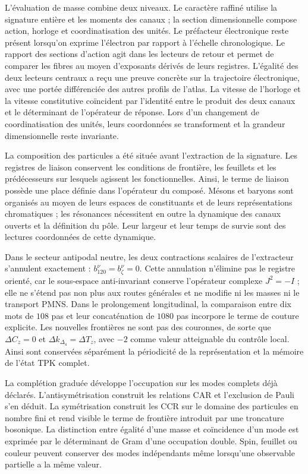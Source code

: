 L’évaluation de masse combine deux niveaux. Le caractère raffiné utilise
la signature entière et les moments des canaux ; la section dimensionnelle
compose action, horloge et coordinatisation des unités. Le préfacteur électronique
reste présent lorsqu’on exprime l’électron par rapport à l’échelle
chronologique. Le rapport des sections d’action agit dans les lecteurs
de retour et permet de comparer les fibres au moyen d’exposants dérivés de
leurs registres. L’égalité des deux lecteurs centraux a reçu
une preuve concrète sur la trajectoire électronique, avec une portée
différenciée des autres profils de l’atlas.
La vitesse de l’horloge et la vitesse constitutive coïncident par
l’identité entre le produit des deux canaux et le déterminant de
l’opérateur de réponse. Lors d’un changement de coordinatisation des unités, leurs coordonnées
se transforment et la grandeur dimensionnelle reste invariante.

La composition des particules a été située avant l’extraction de
la signature. Les registres de liaison conservent les conditions de frontière,
les feuillets et les prédécesseurs sur lesquels agissent les fonctionnelles. Ainsi,
le terme de liaison possède une place définie dans l’opérateur du
composé. Mésons et baryons sont organisés au moyen de leurs espaces de
constituants et de leurs représentations chromatiques ; les résonances
nécessitent en outre la dynamique des canaux ouverts et la définition du
pôle. Leur largeur et leur temps de survie sont des lectures coordonnées
de cette dynamique.

Dans le secteur antipodal neutre, les deux contractions scalaires de
l’extracteur s’annulent exactement :
\(b_{120}^{\nu}=b_{\zeta}^{\nu}=0\). Cette annulation n’élimine pas le
registre orienté, car le sous-espace anti-invariant conserve l’opérateur
complexe \(J^2=-I\) ; elle ne s’étend pas non plus aux routes générales et ne modifie
ni les masses ni le transport PMNS. Dans le prolongement longitudinal, la
comparaison entre dix mots de \(108\) pas et leur concaténation de
\(1080\) pas incorpore le terme de couture explicite. Les nouvelles
frontières ne sont pas des couronnes, de sorte que
\(\Delta C_z=0\) et \(\Delta k_{\Delta_4}=\Delta T_z\), avec \(-2\) comme
valeur atteignable du contrôle local. Ainsi sont conservées séparément la
périodicité de la représentation et la mémoire de l’état TPK complet.

La complétion graduée développe l’occupation sur les modes
complets déjà déclarés. L’antisymétrisation construit les relations
CAR et l’exclusion de Pauli s’en déduit. La symétrisation
construit les CCR sur le domaine des particules en nombre fini et rend visible
le terme de frontière introduit par une troncature bosonique.
La distinction entre égalité d’une masse et coïncidence d’un mode
est exprimée par le déterminant de Gram d’une occupation double.
Spin, feuillet ou couleur peuvent conserver des modes indépendants même lorsqu’une
observable partielle a la même valeur.

